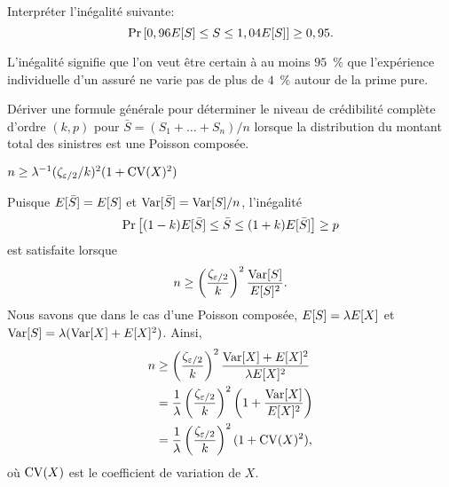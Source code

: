 \begin{exercice}
  Interpréter l'inégalité suivante:
  \begin{displaymath}
    \Pr
    \left[
      0,96 E [ S ] \leq S \leq 1,04 E [ S ]
    \right]
    \geq 0,95.
  \end{displaymath}
  \begin{rep}
    L'inégalité signifie que l'on veut être certain à au moins $95$~\%
    que l'expérience individuelle d'un assuré ne varie pas de plus de
    $4$~\% autour de la prime pure.
  \end{rep}
\end{exercice}

\begin{exercice}
  \label{ex:stabilite:nPC}
  Dériver une formule générale pour déterminer le niveau de
  crédibilité complète d'ordre $(k, p)$ pour $\bar{S} = (S_1 + \dots +
  S_n)/n$ lorsque la distribution du montant total des sinistres est
  une Poisson composée.
  \begin{rep}
    $n \geq \lambda^{-1} (\zeta_{\varepsilon/2}/k)^2 (1 + \operatorname{CV}(X)^2)$
  \end{rep}
  \begin{sol}
    Puisque $E [ \bar{S} ] = E [ S ]$ et $\operatorname{Var} [ \bar{S} ] = \operatorname{Var} [ S ]/n$,
    l'inégalité
    \begin{displaymath}
      \Pr
      \left[
        (1 - k) E [ \bar{S} ] \leq \bar{S} \leq (1 + k) E [ \bar{S} ]
      \right]
      \geq p
    \end{displaymath}
    est satisfaite lorsque
    \begin{displaymath}
      n \ge
      \left( \frac{\zeta_{\varepsilon/2}}{k} \right)^2
      \frac{\operatorname{Var} [ S ]}{E [ S ]^2}.
    \end{displaymath}
    Nous savons que dans le cas d'une Poisson composée,
    $E [ S ] = \lambda E [ X ]$ et
    $\operatorname{Var} [ S ] = \lambda (\operatorname{Var} [ X ] + E [ X ]^2)$. Ainsi,
    \begin{align*}
      n
      & \geq \left( \frac{\zeta_{\varepsilon/2}}{k} \right)^2
      \frac{\operatorname{Var} [ X ] + E [ X ]^2}{\lambda E [ X ]^2} \\
      &= \frac{1}{\lambda} \left( \frac{\zeta_{\varepsilon/2}}{k}
      \right)^2 \left( 1 + \frac{\operatorname{Var} [ X ]}{E [ X ]^2}
      \right) \\
      &= \frac{1}{\lambda} \left( \frac{\zeta_{\varepsilon/2}}{k}
      \right)^2 (1 + \operatorname{CV}(X)^2),
    \end{align*}
    où $\operatorname{CV}(X)$ est le coefficient de variation de $X$.
  \end{sol}
\end{exercice}

